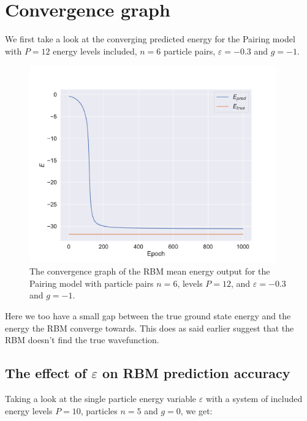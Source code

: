 \section{Convergence graph}

We first take a look at the converging predicted energy for the Pairing model with $P = 12$ energy levels included, $n = 6$ particle pairs, $\varepsilon = -0.3$ and $g = -1$.

\begin{figure}[H]
  \begin{center}
    \includegraphics[width=0.95\textwidth]{Figures/Plots/Pairing/pairing_conv12}
  \end{center}
  \caption{The convergence graph of the RBM mean energy output for the Pairing model with particle pairs $n = 6$, levels $P=12$, and $\varepsilon=-0.3$ and $g=-1$.}
\end{figure}

Here we too have a small gap between the true ground state energy and the energy the RBM converge towards. This does as said earlier suggest that the RBM doesn't find the true wavefunction. 

\subsection{The effect of \texorpdfstring{$\varepsilon$}{epsilon} on RBM prediction accuracy}

Taking a look at the single particle energy variable $\varepsilon$ with a system of included energy levels $P = 10$, particles $n = 5$ and $g = 0$, we get:

